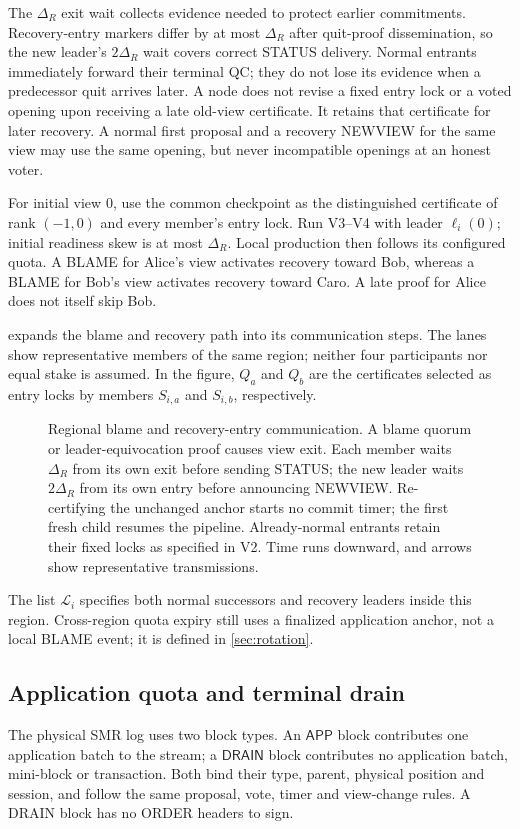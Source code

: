 \documentclass[11pt,a4paper,onecolumn]{article}
\newcommand{\Tag}[1]{\ensuremath{\mathsf{#1}}}
\begin{document}
The $\Delta_R$ exit wait collects evidence needed to protect earlier
commitments. Recovery-entry markers differ by at most $\Delta_R$ after
quit-proof dissemination, so the new leader's $2\Delta_R$ wait covers
correct STATUS delivery. Normal entrants immediately forward their terminal
QC; they do not lose its evidence when a predecessor quit arrives later.
A node does not revise a fixed entry lock or a voted opening upon receiving
a late old-view certificate. It retains that certificate for later recovery.
A normal first proposal and a recovery NEWVIEW for the same view may use
the same opening, but never incompatible openings at an honest voter.

For initial view $0$, use the common checkpoint as the distinguished
certificate of rank $(-1,0)$ and every member's entry lock. Run V3--V4
with leader $\ell_i(0)$; initial readiness skew is at most $\Delta_R$.
Local production then follows its configured quota. A BLAME for Alice's
view activates recovery toward Bob, whereas a BLAME for Bob's view activates
recovery toward Caro. A late proof for Alice does not itself skip Bob.

 expands the blame and recovery path into its communication
steps. The lanes show representative members of the same region; neither
four participants nor equal stake is assumed. In the figure, $Q_a$ and
$Q_b$ are the certificates selected as entry locks by members $S_{i,a}$
and $S_{i,b}$, respectively.

\begin{figure}[p]\centering
\resizebox{\linewidth}{!}{}
\caption{Regional blame and recovery-entry communication. A blame quorum or
leader-equivocation proof causes view exit. Each member waits $\Delta_R$
from its own exit before sending STATUS; the new leader waits $2\Delta_R$
from its own entry before announcing NEWVIEW. Re-certifying the unchanged
anchor starts no commit timer; the first fresh child resumes the pipeline.
Already-normal entrants retain their fixed locks as specified in V2.
Time runs downward, and arrows show representative transmissions.}
\label{fig:change}
\end{figure}

The list $\mathcal L_i$ specifies both normal successors and recovery leaders
inside this region. Cross-region quota expiry still uses a finalized
application anchor, not a local BLAME event; it is defined in \cref{sec:rotation}.

\subsection{Application quota and terminal drain}\label{sec:drain}
The physical SMR log uses two block types. An \Tag{APP} block contributes
one application batch to the stream; a \Tag{DRAIN} block contributes no
application batch, mini-block or transaction. Both bind their type, parent,
physical position and session, and follow the same proposal, vote, timer
and view-change rules. A DRAIN block has no ORDER headers to sign.
\end{document}
